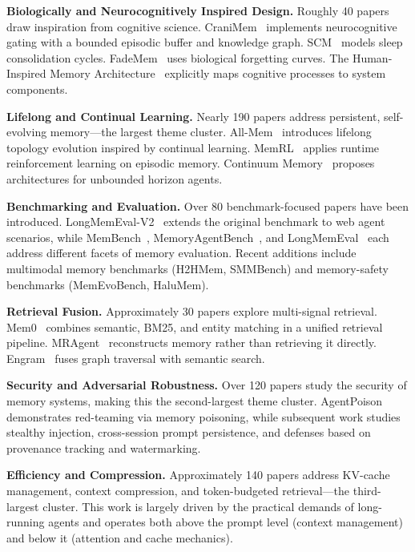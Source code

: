 \textbf{Biologically and Neurocognitively Inspired Design.} Roughly 40 papers draw inspiration from cognitive science. CraniMem~\cite{Unknown2026CraniMem} implements neurocognitive gating with a bounded episodic buffer and knowledge graph. SCM~\cite{Unknown2026SCM} models sleep consolidation cycles. FadeMem~\cite{Unknown2026FadeMem} uses biological forgetting curves. The Human-Inspired Memory Architecture~\cite{Unknown2026HumanInspiredMemoryA} explicitly maps cognitive processes to system components.

\textbf{Lifelong and Continual Learning.} Nearly 190 papers address persistent, self-evolving memory---the largest theme cluster. All-Mem~\cite{Unknown2026AllMem} introduces lifelong topology evolution inspired by continual learning. MemRL~\cite{Unknown2026MemRL} applies runtime reinforcement learning on episodic memory. Continuum Memory~\cite{Unknown2026ContinuumMemoryArchi} proposes architectures for unbounded horizon agents.

\textbf{Benchmarking and Evaluation.} Over 80 benchmark-focused papers have been introduced. LongMemEval-V2~\cite{Unknown2026LongMemEvalV2} extends the original benchmark to web agent scenarios, while MemBench~\cite{Tan2025MemBench}, MemoryAgentBench~\cite{Unknown2025MemoryAgentBench}, and LongMemEval~\cite{Wu2024LongMemEval} each address different facets of memory evaluation. Recent additions include multimodal memory benchmarks (H2HMem, SMMBench) and memory-safety benchmarks (MemEvoBench, HaluMem).

\textbf{Retrieval Fusion.} Approximately 30 papers explore multi-signal retrieval. Mem0~\cite{Unknown2025Mem0} combines semantic, BM25, and entity matching in a unified retrieval pipeline. MRAgent~\cite{Unknown2026MRAgent} reconstructs memory rather than retrieving it directly. Engram~\cite{Unknown2026Engram} fuses graph traversal with semantic search.

\textbf{Security and Adversarial Robustness.} Over 120 papers study the security of memory systems, making this the second-largest theme cluster. AgentPoison~\cite{Unknown2025AgentPoison} demonstrates red-teaming via memory poisoning, while subsequent work studies stealthy injection, cross-session prompt persistence, and defenses based on provenance tracking and watermarking.

\textbf{Efficiency and Compression.} Approximately 140 papers address KV-cache management, context compression, and token-budgeted retrieval---the third-largest cluster. This work is largely driven by the practical demands of long-running agents and operates both above the prompt level (context management) and below it (attention and cache mechanics).

